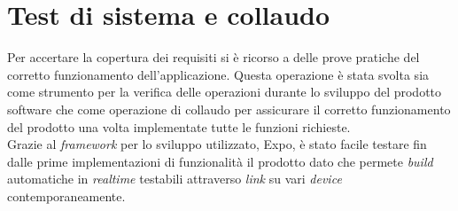 \section{Test di sistema e collaudo}
Per accertare la copertura dei requisiti si è ricorso a delle prove pratiche del corretto funzionamento dell’applicazione. Questa operazione è stata svolta sia come strumento per la verifica delle operazioni durante lo sviluppo del prodotto software che come operazione di collaudo per assicurare il corretto funzionamento del prodotto una volta implementate tutte le funzioni richieste. \\
Grazie al \emph{framework} per lo sviluppo utilizzato, Expo, è stato facile testare fin dalle prime implementazioni di funzionalità il prodotto dato che permete \emph{build} automatiche in \emph{realtime} testabili attraverso \emph{link} su vari \emph{device} contemporaneamente.

